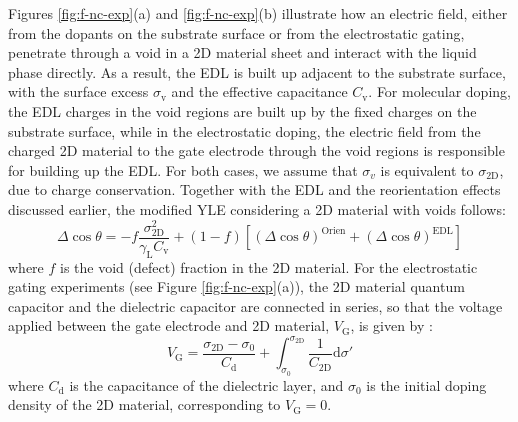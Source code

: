 Figures \ref{fig:f-nc-exp}(a) and \ref{fig:f-nc-exp}(b) illustrate how
an electric field, either from the dopants on the substrate surface or
from the electrostatic gating, penetrate through a void in a 2D
material sheet and interact with the liquid phase directly. As a
result, the EDL is built up adjacent to the substrate surface, with
the surface excess \(\sigma_{\mathrm{v}}\) and the effective
capacitance \(C_{\mathrm{v}}\).  For molecular doping, the EDL charges
in the void regions are built up by the fixed charges on the substrate
surface, while in the electrostatic doping, the electric field from
the charged 2D material to the gate electrode through the void regions
is responsible for building up the EDL. For both cases, we assume that
\(\sigma_{v}\) is equivalent to \(\sigma_{\mathrm{2D}}\), due to
charge conservation. Together with the EDL and the reorientation
effects discussed earlier, the modified YLE considering a 2D material
with voids follows:
\begin{equation}
\label{eqn-def-Delta-cos-mixture}
\Delta \cos \theta = -f\frac{\sigma_{\mathrm{2D}}^{2}}{\gamma_{\mathrm{L}} C_{\mathrm{v}}} 
                     + (1-f)[(\Delta \cos \theta)^{\mathrm{Orien}} + (\Delta \cos \theta)^{\mathrm{EDL}}]
\end{equation}
where \(f\) is the void (defect) fraction in the 2D material. For the
electrostatic gating experiments (see Figure
\ref{fig:f-nc-exp}(a)), the 2D material quantum capacitor
and the dielectric  capacitor are connected in
series, so that the voltage applied between the gate electrode and
2D material, \(V_{\mathrm{G}}\), is given by \cite{tian_multiscale_2016}:
\begin{equation}
\label{eqn-VG-gating}
V_{\mathrm{G}} = \frac{\sigma_{\mathrm{2D}} - \sigma_{\mathrm{0}}}{C_{\mathrm{d}}}
                  + \int_{\sigma_{0}}^{\sigma_{\mathrm{2D}}} \frac{1}{C_{\mathrm{2D}}} \mathrm{d}\sigma'
\end{equation}
where \(C_{\mathrm{d}}\) is the capacitance of the dielectric layer, and
\(\sigma_{0}\) is the initial doping density of the 2D material,
corresponding to \(V_{\mathrm{G}}=0\).



